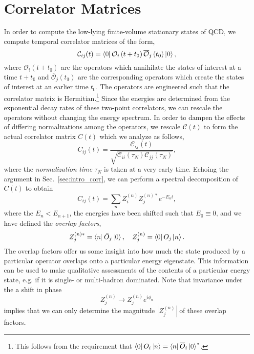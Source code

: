 \section{Correlator Matrices}
In order to compute the low-lying finite-volume stationary states of QCD, we compute temporal correlator matrices of the form,
\begin{equation}
    \mathcal{C}_{i j}(t)=\bra 0 \mathcal O_{i}\left(t+t_{0}\right) \overline{\mathcal O}_{j}\left(t_{0}\right)\ket 0,
\end{equation}
where $\mathcal O_i(t+t_0)$ are the operators which annihilate the states of interest at a time $t+t_0$ and $\overline{\mathcal O}_j(t_0)$ are the corresponding operators which create the states of interest at an earlier time $t_0$. The operators are engineered such that the correlator matrix is Hermitian.\footnote{This follows from the requirement that $\bra 0 O_i \ket n = \bra n \overline O_i \ket 0 ^*$.} Since the energies are determined from the exponential decay rates of these two-point correlators, we can rescale the operators without changing the energy spectrum. In order to dampen the effects of differing normalizations among the operators, we rescale $\mathcal C(t)$ to form the actual correlator matrix $C(t)$ which we analyze as follows,
\begin{equation}
    C_{ij}(t) = \frac{\mathcal C_{ij}(t)}{\sqrt{\mathcal C_{ii}(\tau_N) \mathcal C_{jj}(\tau_N)}},
\end{equation}
where the \emph{normalization time} $\tau_N$ is taken at a very early time. Echoing the argument in Sec.~\ref{sec:intro_corr}, we can perform a spectral decomposition of $C(t)$ to obtain
\begin{equation}\label{eq:corr_spec_decomp}
    C_{i j}(t)=\sum_{n} Z_{i}^{(n)} Z_{j}^{(n) *} e^{-E_{n} t},
\end{equation}
where the $E_n < E_{n+1}$, the energies have been shifted such that $E_0\equiv 0$, and we have defined the \emph{overlap factors},
\begin{equation}
    Z_{j}^{(n) *}=\bra n \bar{O}_{j}\ket 0, \quad Z_{j}^{(n)}=\bra 0 O_{j} \ket n.
\end{equation}
The overlap factors offer us some insight into how much the state produced by a particular operator overlaps onto a particular energy eigenstate. This information can be used to make qualitative assessments of the contents of a particular energy state, e.g. if it is single- or multi-hadron dominated. Note that invariance under the a shift in phase
\begin{equation}
    Z_{j}^{(n)} \rightarrow Z_{j}^{(n)} e^{i \phi_{n}}
\end{equation}
implies that we can only determine the magnitude $|Z_j^{(n)}|$ of these overlap factors.
